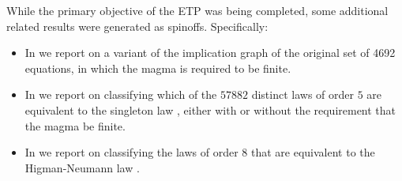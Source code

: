 While the primary objective of the ETP was being completed, some additional related results were generated as spinoffs.  Specifically:
\begin{itemize}
\item In  we report on a variant of the implication graph of the original set of 4692 equations, in which the magma is required to be finite.
\item In  we report on classifying which of the $57882$ distinct laws of order $5$ are equivalent to the singleton law , either with or without the requirement that the magma be finite.
\item In  we report on classifying the laws of order $8$ that are equivalent to the Higman-Neumann law .
\end{itemize}

